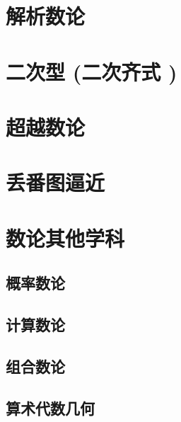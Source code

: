 \documentclass[UTF8]{../09-Mathematics}
\begin{document}
\chapter{解析数论}

\chapter{二次型 (二次齐式 )}



\chapter{超越数论}
\chapter{丢番图逼近}





\chapter{数论其他学科}

\section{概率数论}
\section{计算数论}
\section{组合数论}
\section{算术代数几何}
\end{document}

